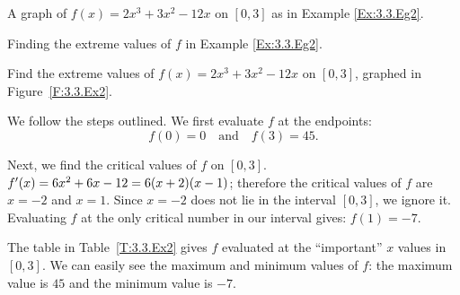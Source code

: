 \begin{marginfigure}
\caption{A graph of $f(x) = 2x^3+3x^2-12x$ on $[0,3]$ as in Example \ref{Ex:3.3.Eg2}. } \label{F:3.3.Ex2}
\end{marginfigure}

\begin{margintable}
\begin{center}
\end{center}
\caption{Finding the extreme values of $f$ in Example \ref{Ex:3.3.Eg2}.} \label{T:3.3.Ex2}
\end{margintable}

\begin{example} \label{Ex:3.3.Eg2}
Find the extreme values of $f(x) = 2x^3+3x^2-12x$ on $[0,3]$, graphed in Figure~\ref{F:3.3.Ex2}.

\solution
We follow the steps outlined. We first evaluate $f$ at the endpoints: $$f(0) = 0 \quad \text{and}\quad f(3) =45.$$

Next, we find the critical values of $f$ on $[0,3]$. $f'(x) = 6x^2+6x-12 = 6(x+2)(x-1)$; therefore the critical values of $f$ are $x=-2$ and $x=1$. Since $x=-2$ does not lie in the interval $[0,3]$, we ignore it. Evaluating $f$ at the only critical number in our interval gives: $f(1) = -7$. 

The table in Table~\ref{T:3.3.Ex2} gives $f$ evaluated at the ``important'' $x$ values in $[0,3]$. We can easily see the maximum and minimum values of $f$: the maximum value is $45$ and the minimum value is $-7$.


\end{example}